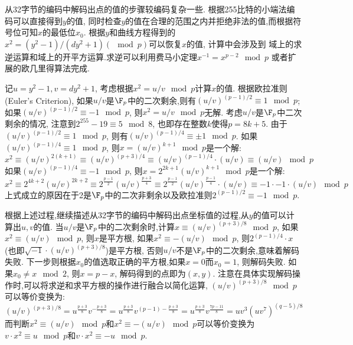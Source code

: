从32字节的编码中解码出点的值的步骤较编码复杂一些. 根据255比特的小端法编码可以直接得到$y$的值,
同时检查$y$的值在合理的范围之内并拒绝非法的值,而根据符号位可知$x$的最低位$x_0$.
根据$y$和曲线方程得到的$x^2 = (y^2-1) / (dy^2 + 1) (\mod p)$可以恢复$x$的值, 计算中会涉及到
域上的求逆运算和域上的开平方运算.求逆可以利用费马小定理$x^{-1} = x^{p-2} \mod p$
或者扩展的欧几里得算法完成.

记$u = y^2-1, v = dy^2 + 1$, 考虑根据$x^2 = u/v \mod p$计算$x$的值.
根据欧拉准则(Euler's Criterion),
如果$u/v$是$\F_p$中的二次剩余,则有$(u/v)^{(p-1)/2} \equiv 1 \mod p$;
如果$(u/v)^{(p-1)/2} \equiv -1 \mod p$, 则$x^2 = u/v \mod p$无解.
考虑$u/v$是$\F_p$中二次剩余的情况, 
注意到$2^{255}-19 \equiv 5 \mod 8$, 也即存在整数$k$使得$p = 8k + 5$.
由于$(u/v)^{(p-1)/2} \equiv 1 \mod p$, 则有$(u/v)^{(p-1)/4} \equiv \pm 1 \mod p$.
如果$(u/v)^{(p-1)/4} \equiv 1 \mod p$, 则$x = (u/v)^{k+1}\mod p$是一个解:
$$
x^2 \equiv (u/v)^{2(k+1)} \equiv (u/v)^{(p+3)/4} \equiv (u/v)^{(p-1)/4}\cdot (u/v) \equiv (u/v) \mod p 
$$
如果$(u/v)^{(p-1)/4} \equiv -1 \mod p$, 则$x = 2^{2k+1}(u/v)^{k+1}\mod p$是一个解:
$$
x^2 \equiv 2^{4k+2}(u/v)^{2k+2} \equiv 2^{\frac{p-1}{2}}(u/v)^{\frac{p+3}{4}} \equiv
 2^{\frac{p-1}{2}} (u/v)^{\frac{p-1}{4}}\cdot (u/v) \equiv -1 \cdot -1 \cdot (u/v) \mod p
$$
上式成立的原因在于2是$\F_p$中的二次非剩余以及欧拉准则$2^{(p-1)/2}\equiv -1 \mod p$.

根据上述过程,继续描述从32字节的编码中解码出点坐标值的过程,从$y$的值可以计算出$u, v$的值.
当$u/v$是$\F_p$中的二次剩余时,计算$x \equiv (u/v)^{(p+3)/8}\mod p$,
如果$x^2 \equiv (u/v) \mod p$, 则$x$是平方根,
如果$x^2 \equiv -(u/v)\mod p$, 则$2^{(p-1)/4} \cdot x$ (也即$\sqrt{-1}\cdot (u/v)^{(p+3)/8}$)是平方根,
否则$u/v$不是$\F_p$中的二次剩余,意味着解码失败.
下一步则根据$x_0$的值选取正确的平方根,如果$x = 0$而$x_0 = 1$, 则解码失败.
如果$x_0 \neq x \mod 2$, 则$x = p-x$, 解码得到的点即为$(x,y)$.
注意在具体实现解码操作时,可以将求逆和求平方根的操作进行融合以简化运算,
$(u/v)^{(p+3)/8}\mod p$可以等价变换为:
$$
(u/v)^{(p+3)/8} = u^{\frac{p+3}{8}} v^{-\frac{p+3}{8}}
= u^{\frac{p+3}{8}} v^{(p-1)-\frac{p+3}{8}}
= u^{\frac{p+3}{8}} v^{\frac{7p-11}{8}}
= uv^3(uv^7)^{(q-5)/8} 
$$
而判断$x^2\equiv (u/v) \mod p$和$x^2 \equiv -(u/v) \mod p$可以等价变换为
$v \cdot x^2 \equiv u \mod p$和$v \cdot x^2 \equiv -u \mod p$.

